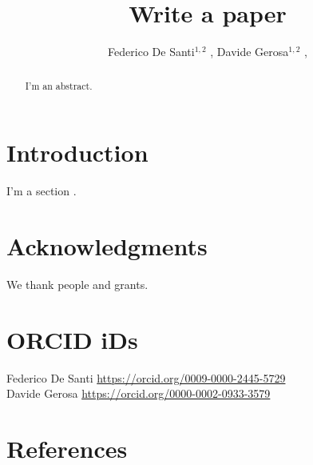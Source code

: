 \documentclass[]{iopart}
\newcommand{\milan}{{Dipartimento di Fisica ``G. Occhialini'', Universit\'a degli Studi di Milano-Bicocca, Piazza della Scienza 3, 20126 Milano, Italy}}
\newcommand{\infn}{{INFN, Sezione di Milano-Bicocca, Piazza della Scienza 3, 20126 Milano, Italy}}
\begin{document}
\begin{center}
\title[F.~De Santi et al.]{Write a paper}
\end{center}

\author{
Federico De Santi$^{1,2}$ , Davide Gerosa$^{1,2}$ ,
}
\vspace{0.1cm}
\address{$^{1}$~\milan}
\address{$^{2}$~\infn}


\setcounter{footnote}{0}


\begin{abstract}
I'm an abstract. 
\end{abstract}


\section{Introduction}

I'm a section \cite{2016PhRvL.116f1102A}.



\section*{Acknowledgments}

We thank people and grants.

\section*{ORCID iDs}
Federico De Santi  \href{https://orcid.org/0009-0000-2445-5729}{https://orcid.org/0009-0000-2445-5729} \\
Davide Gerosa  \href{https://orcid.org/0000-0002-0933-3579}{https://orcid.org/0000-0002-0933-3579} \\


\section*{References}


\end{document}
